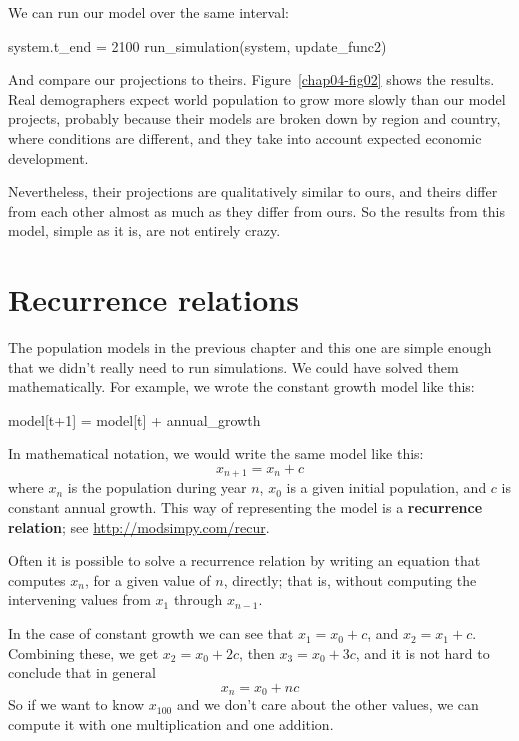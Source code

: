 \documentclass[12pt]{book}
\theoremstyle{exercise}
\begin{document}
We can run our model over the same interval:

\begin{python}
system.t_end = 2100
run_simulation(system, update_func2)
\end{python}

And compare our projections to theirs.  Figure~\ref{chap04-fig02} shows the results.  Real demographers expect world population to grow more slowly than our model projects, probably because their models are broken down by region and country, where conditions are different, and they take into account expected economic development.

Nevertheless, their projections are qualitatively similar to ours, and theirs differ from each other almost as much as they differ from ours.  So the results from this model, simple as it is, are not entirely crazy.


\section{Recurrence relations}

The population models in the previous chapter and this one are simple enough that we didn't really need to run simulations.  We could have solved them mathematically.  For example, we wrote the constant growth model like this:

\begin{python}
model[t+1] = model[t] + annual_growth
\end{python}

In mathematical notation, we would write the same model like this:
%
\[ x_{n+1} = x_n + c \]
%
where $x_n$ is the population during year $n$, $x_0$ is a given initial population, and $c$ is constant annual growth.  This way of representing the model is a {\bf recurrence relation}; see \url{http://modsimpy.com/recur}.

Often it is possible to solve a recurrence relation by writing an equation that computes $x_n$, for a given value of $n$, directly; that is, without computing the intervening values from $x_1$ through $x_{n-1}$.

In the case of constant growth we can see that $x_1 = x_0 + c$, and $x_2 = x_1 + c$.  Combining these, we get $x_2 = x_0 + 2c$, then $x_3 = x_0 + 3c$, and it is not hard to conclude that in general
%
\[ x_n = x_0 + nc \]
%
So if we want to know $x_{100}$ and we don't care about the other values, we can compute it with one multiplication and one addition.
\end{document}
